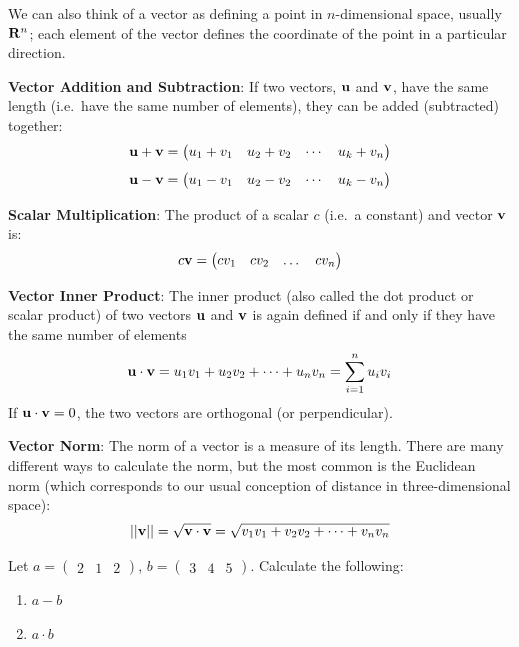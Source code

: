 \documentclass[]{book}
\theoremstyle{definition}
\theoremstyle{definition}
\theoremstyle{definition}
\theoremstyle{remark}
\let\BeginKnitrBlock\begin \let\EndKnitrBlock\end
\begin{document}
We can also think of a vector as defining a point in \(n\)-dimensional
space, usually \({\bf R}^n\); each element of the vector defines the
coordinate of the point in a particular direction.

\textbf{Vector Addition and Subtraction}: If two vectors, \({\bf u}\)
and \({\bf v}\), have the same length (i.e.~have the same number of
elements), they can be added (subtracted) together:
\[ {\bf u} + {\bf v} = \begin{pmatrix} u_1 + v_1 & u_2 + v_2 & \cdots & u_k + v_n \end{pmatrix}\]
\[ {\bf u} - {\bf v} = \begin{pmatrix} u_1 - v_1 & u_2 - v_2 & \cdots & u_k - v_n \end{pmatrix}\]

\textbf{Scalar Multiplication}: The product of a scalar \(c\) (i.e.~a
constant) and vector \({\bf v}\) is:\\
\[ c{\bf v} =  \begin{pmatrix} cv_1 & cv_2 & \dots & cv_n \end{pmatrix} \]

\textbf{Vector Inner Product}: The inner product (also called the dot
product or scalar product) of two vectors \({\bf u}\) and \({\bf v}\) is
again defined if and only if they have the same number of elements
\[ {\bf u} \cdot {\bf v} = u_1v_1 + u_2v_2 + \cdots + u_nv_n = \sum_{i = 1}^n u_iv_i\]
If \({\bf u} \cdot {\bf v} = 0\), the two vectors are orthogonal (or
perpendicular).

\textbf{Vector Norm}: The norm of a vector is a measure of its length.
There are many different ways to calculate the norm, but the most common
is the Euclidean norm (which corresponds to our usual conception of
distance in three-dimensional space):
\[ ||{\bf v}|| = \sqrt{{\bf v}\cdot{\bf v}} = \sqrt{ v_1v_1 + v_2v_2 + \cdots + v_nv_n}\]

\BeginKnitrBlock{example}[Vector Algebra]
\protect\hypertarget{exm:vectors}{}{\label{exm:vectors} {} } Let \(a = \begin{pmatrix} 2&1&2\end{pmatrix}\),
\(b = \begin{pmatrix} 3&4&5 \end{pmatrix}\). Calculate the following:

\begin{enumerate}
\def\labelenumi{\arabic{enumi}.}
\item
  \(a - b\)
\item
  \(a \cdot b\)
\end{enumerate}
\EndKnitrBlock{example}
\end{document}
